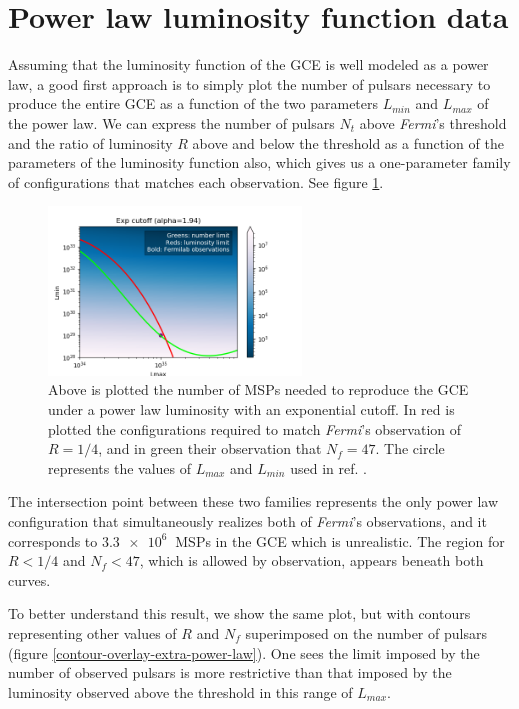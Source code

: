 \documentclass{C://Aliases//Dropbox-MIT//Latex_Templates//personal}
\begin{document}
\section{Power law luminosity function data}
Assuming that the luminosity function of the GCE is well modeled as a power law, a good first approach is to simply plot the number of pulsars necessary to produce the entire GCE as a function of the two parameters $L_{min}$ and $L_{max}$ of the power law. We can express the number of pulsars $N_t$ above \textit{Fermi}'s threshold and the ratio of luminosity $R$ above and below the threshold as a function of the parameters of the luminosity function also, which gives us a one-parameter family of configurations that matches each observation. See figure \ref{contour-overlay-power-law}. 

\begin{figure}[h]
    \centering
    \includegraphics[width=0.6\textwidth]{../../luminosity-models/power-law/step-sensitivity/contour-overlay.png}
    \caption{Above is plotted the number of MSPs needed to reproduce the GCE under a power law luminosity with an exponential cutoff. In red is plotted the configurations required to match \textit{Fermi}'s observation of $R=1/4$, and in green their observation that $N_f = 47$. The circle represents the values of $L_{max}$ and $L_{min}$ used in ref. \cite{fermilab}.}
    \label{contour-overlay-power-law}
\end{figure}

The intersection point between these two families represents the only power law configuration that simultaneously realizes both of \textit{Fermi}'s observations, and it corresponds to $\SI{3.3e6}{}$ MSPs in the GCE which is unrealistic. The region for $R < 1/4$ and $N_f < 47$, which is allowed by observation, appears beneath both curves.

To better understand this result, we show the same plot, but with contours representing other values of $R$ and $N_f$ superimposed on the number of pulsars (figure \ref{contour-overlay-extra-power-law}). One sees the limit imposed by the number of observed pulsars is more restrictive than that imposed by the luminosity observed above the threshold in this range of $L_{max}$.
\end{document}
